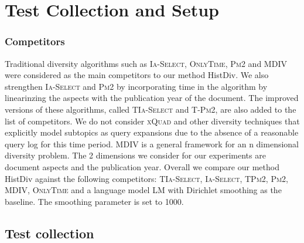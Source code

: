 \section{Test Collection and Setup} %
\label{cha:experiemts}


\subsubsection{Competitors} %
\label{sub:subsection_name}

Traditional diversity algorithms such as \textsc{Ia-Select}, \textsc{OnlyTime}, \textsc{Pm2} and \textsc{MDIV} were considered as the main competitors to our method HistDiv. We also strengthen \textsc{Ia-Select} and \textsc{Pm2} by incorporating time in the algorithm by linearinzing the aspects with the publication year of the document. The improved versions of these algorithms, called \textsc{TIa-Select} and T-\textsc{Pm2}, are also added to the list of competitors. We do not consider \textsc{xQuad} \cite{santos2010exploiting} and other diversity techniques that explicitly model subtopics as query expansions due to the absence of a reasonable query log for this time period. \textsc{MDIV} is a general framework for an n dimensional diversity problem. The 2 dimensions we consider for our experiments are document aspects and the publication year. Overall we compare our method HistDiv against the following competitors: \textsc{TIa-Select}, \textsc{Ia-Select}, \textsc{TPm2}, \textsc{Pm2}, \textsc{MDIV}, \textsc{OnlyTime} and a language model \textsc{LM} with Dirichlet smoothing as the baseline. The smoothing parameter is set to 1000.
 
\subsection{Test collection} %
\label{sub:subsection_name}



%


